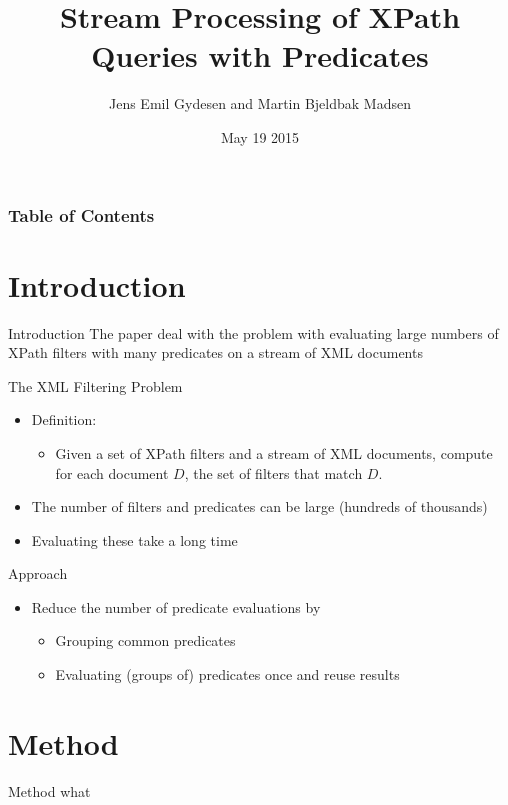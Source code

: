 \documentclass[mathserif,serif]{beamer}
\title{\large Stream Processing of XPath Queries with Predicates}
\author{Jens Emil Gydesen and Martin Bjeldbak Madsen}
\date{May 19 2015}
\begin{document}
\frame{\titlepage}

\begin{frame}
  \frametitle{Table of Contents}
  \tableofcontents[hideallsubsections]
\end{frame}


\section{Introduction}
\begin{frame}{Introduction}
  The paper deal with the problem with evaluating large numbers of XPath filters with many predicates on a stream of XML documents
\end{frame}

\begin{frame}{The XML Filtering Problem}
  \begin{itemize}
    \item Definition:
    \begin{itemize}
      \item Given a set of XPath filters and a stream of XML documents, compute for each document $D$, the set of filters that match $D$.
    \end{itemize}
    \item The number of filters and predicates can be large (hundreds of thousands)
    \item Evaluating these take a long time
  \end{itemize}
\end{frame}

\begin{frame}{Approach}
  \begin{itemize}
    \item Reduce the number of predicate evaluations by
    \begin{itemize}
      \item Grouping common predicates 
      \item Evaluating (groups of) predicates once and reuse results
    \end{itemize}
  \end{itemize}
\end{frame}

\section{Method}
\begin{frame}{Method}
  what
\end{frame}
\end{document}
